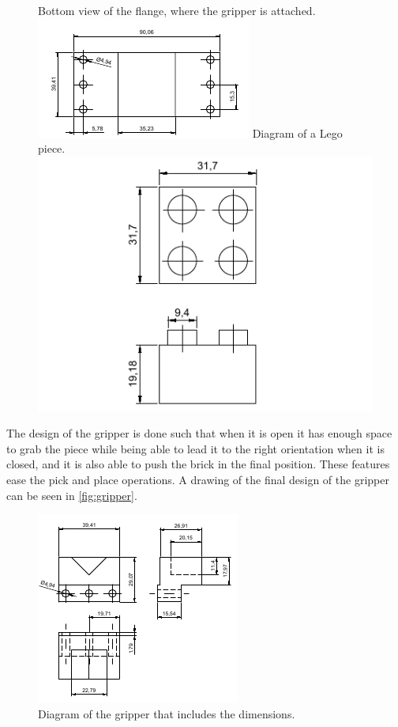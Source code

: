 \begin{figure}[H]
    \captionbox
    {
        Bottom view of the flange, where the gripper is attached.
        \label{fig:holder}                                 
    }                                                                 
    {                                                                  
        \includegraphics[width=.4\textwidth]{figures/holder}         
    }                                                                   
    \hspace{5pt}
    \captionbox
    {
        Diagram of a Lego piece.
        \label{fig:legobrick}                                     
    }                                                                           
    {                                                                            
        \includegraphics[width=.4\textwidth]{figures/LegoPiece}            
    }                                                                            
\end{figure}
The design of the gripper is done such that when it is open it has enough space to grab the piece while being able to lead it to the right orientation when it is closed, and it is also able to push the brick in the final position. These features ease the pick and place operations. A drawing of the final design of the gripper can be seen in \autoref{fig:gripper}.

\begin{figure}[H]
    \includegraphics[width=.4\textwidth]{figures/gripper}
    \caption{Diagram of the gripper that includes the dimensions.}
    \label{fig:gripper}  
\end{figure}

